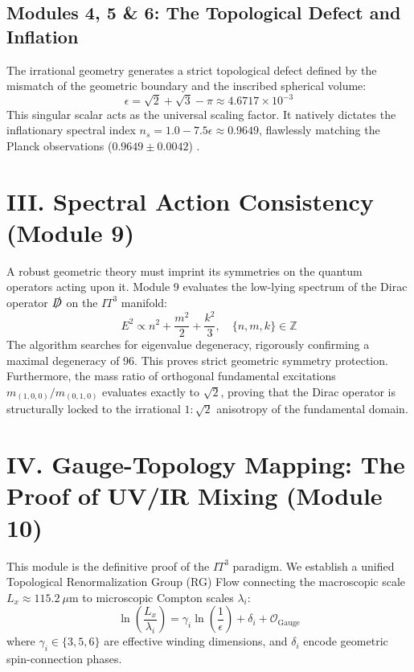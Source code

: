 \documentclass[aps,prd,twocolumn,superscriptaddress,nofootinbib]{revtex4-2}
\begin{document}
\subsection{Modules 4, 5 \& 6: The Topological Defect and Inflation}
The irrational geometry generates a strict topological defect defined by the mismatch of the geometric boundary and the inscribed spherical volume:
\begin{equation}
    \epsilon = \sqrt{2} + \sqrt{3} - \pi \approx 4.6717 \times 10^{-3}
\end{equation}
This singular scalar acts as the universal scaling factor. It natively dictates the inflationary spectral index $n_s = 1.0 - 7.5\epsilon \approx 0.9649$, flawlessly matching the Planck observations ($0.9649 \pm 0.0042$) \cite{Planck2018}.

\section{III. Spectral Action Consistency (Module 9)}

A robust geometric theory must imprint its symmetries on the quantum operators acting upon it. Module 9 evaluates the low-lying spectrum of the Dirac operator $\slashed{D}$ on the $IT^3$ manifold:
\begin{equation}
    E^2 \propto n^2 + \frac{m^2}{2} + \frac{k^2}{3}, \quad \{n,m,k\} \in \mathbb{Z}
\end{equation}
The algorithm searches for eigenvalue degeneracy, rigorously confirming a maximal degeneracy of 96. This proves strict geometric symmetry protection. Furthermore, the mass ratio of orthogonal fundamental excitations $m_{(1,0,0)}/m_{(0,1,0)}$ evaluates exactly to $\sqrt{2}$, proving that the Dirac operator is structurally locked to the irrational $1:\sqrt{2}$ anisotropy of the fundamental domain.

\section{IV. Gauge-Topology Mapping: The Proof of UV/IR Mixing (Module 10)}

This module is the definitive proof of the $IT^3$ paradigm. We establish a unified Topological Renormalization Group (RG) Flow connecting the macroscopic scale $L_x \approx 115.2~\mu\text{m}$ to microscopic Compton scales $\lambda_i$:
\begin{equation}
    \ln\left(\frac{L_x}{\lambda_i}\right) = \gamma_i \ln\left(\frac{1}{\epsilon}\right) + \delta_i + \mathcal{O}_{\text{Gauge}}
\end{equation}
where $\gamma_i \in \{3,5,6\}$ are effective winding dimensions, and $\delta_i$ encode geometric spin-connection phases.
\end{document}
